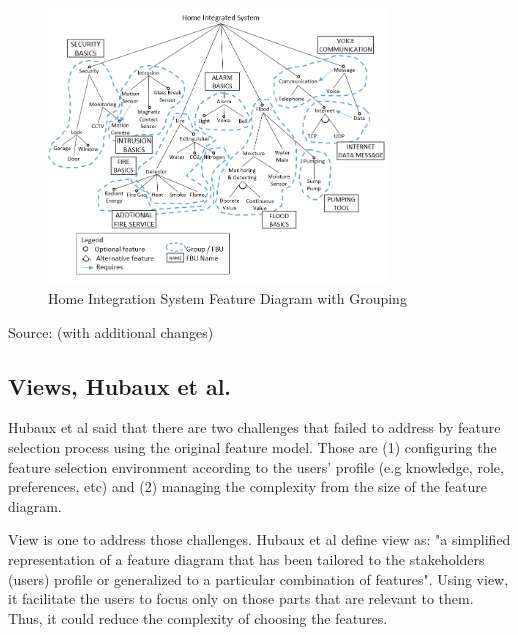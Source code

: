 \begin{figure}
	\centering
	\includegraphics[width=0.8\textwidth]
	{pics/hisfd4group3a.png}
	\caption{Home Integration System Feature Diagram with Grouping}
	\label{fig:FeatureModelFBU}
\end{figure}
\vspace{-1cm}
\begin{center}
	{\small Source: \citep{paper.lee.featurebinding} (with additional changes)}
\end{center}

\subsection{Views, Hubaux et al.}
Hubaux et al \citep{paper.hubaux2013.supportingMultiplePerspective} said that there are two challenges that failed to address by feature selection process using the original feature model. Those are (1) configuring the feature selection environment according to the users' profile (e.g knowledge, role, preferences, etc) and (2) managing the complexity from the size of the feature diagram.

View is one to address those challenges. Hubaux et al \citep{paper.hubaux2013.supportingMultiplePerspective} define view as: "a simplified representation of a feature diagram that has been tailored to the stakeholders (users) profile or generalized to a particular combination of features". Using view, it facilitate the users to focus only on those parts that are relevant to them. Thus, it could reduce the complexity of choosing the features. 

